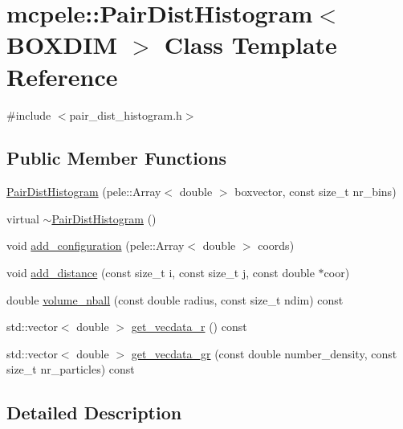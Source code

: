 \hypertarget{classmcpele_1_1PairDistHistogram}{\section{mcpele\-:\-:\-Pair\-Dist\-Histogram$<$ \-B\-O\-X\-D\-I\-M $>$ \-Class \-Template \-Reference}
\label{classmcpele_1_1PairDistHistogram}
}


{\ttfamily \#include $<$pair\-\_\-dist\-\_\-histogram.\-h$>$}

\subsection*{\-Public \-Member \-Functions}
\begin{DoxyCompactItemize}
\item 
\hyperlink{classmcpele_1_1PairDistHistogram_a2eb2e7d4fe32c03f17f85ea18373af1c}{\-Pair\-Dist\-Histogram} (pele\-::\-Array$<$ double $>$ boxvector, const size\-\_\-t nr\-\_\-bins)
\item 
virtual \hyperlink{classmcpele_1_1PairDistHistogram_aa9e464547fc961cb8ec394331369aa55}{$\sim$\-Pair\-Dist\-Histogram} ()
\item 
void \hyperlink{classmcpele_1_1PairDistHistogram_aed454da4feb9525c05fa05389dfa875e}{add\-\_\-configuration} (pele\-::\-Array$<$ double $>$ coords)
\item 
void \hyperlink{classmcpele_1_1PairDistHistogram_afc8c7d70c8fd97c995ff1bcbfb1d2a41}{add\-\_\-distance} (const size\-\_\-t i, const size\-\_\-t j, const double $\ast$coor)
\item 
double \hyperlink{classmcpele_1_1PairDistHistogram_a60dbf068f7b45fa2a4ba59eef078705b}{volume\-\_\-nball} (const double radius, const size\-\_\-t ndim) const 
\item 
std\-::vector$<$ double $>$ \hyperlink{classmcpele_1_1PairDistHistogram_a00a321092cf3d428b36c4ea0695995ac}{get\-\_\-vecdata\-\_\-r} () const 
\item 
std\-::vector$<$ double $>$ \hyperlink{classmcpele_1_1PairDistHistogram_ac5a27c5e7329ac64829fc16c92fb911c}{get\-\_\-vecdata\-\_\-gr} (const double number\-\_\-density, const size\-\_\-t nr\-\_\-particles) const 
\end{DoxyCompactItemize}


\subsection{\-Detailed \-Description}
